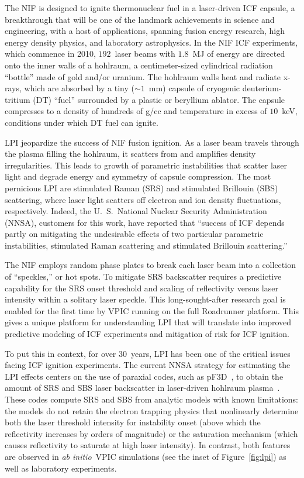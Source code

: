 \documentclass[journal,twoside]{IEEEtran}
\newcommand{\fig}[1]{Figure~\ref{fig:#1}}
\newcommand{\abinitio} {\textit{ab initio}}
\begin{document}
The NIF is designed to ignite thermonuclear fuel in a laser-driven ICF
capsule, a breakthrough that will be one of the landmark achievements
in science and engineering, with a host of applications, spanning
fusion energy research, high energy density physics, and laboratory
astrophysics.  In the NIF ICF experiments, which commence in 2010,
$192$~laser beams with $1.8$~MJ of energy are directed onto the inner
walls of a hohlraum, a centimeter-sized cylindrical radiation
``bottle'' made of gold and/or uranium.  The hohlraum walls heat and
radiate x-rays, which are absorbed by a tiny ($\sim 1$~mm) capsule of
cryogenic deuterium-tritium (DT) ``fuel'' surrounded by a plastic or
beryllium ablator.  The capsule compresses to a density of hundreds of
g/cc and temperature in excess of $10$~keV, conditions under which DT
fuel can ignite.

LPI jeopardize the success of NIF fusion ignition.  As a laser beam
travels through the plasma filling the hohlraum, it scatters from and
amplifies density irregularities.  This leads to growth of parametric
instabilities that scatter laser light and degrade energy and symmetry
of capsule compression.  The most pernicious LPI are stimulated Raman
(SRS) and stimulated Brillouin (SBS) scattering, where laser light
scatters off electron and ion density fluctuations, respectively.
Indeed, the U.~S.~National Nuclear Security Administration (NNSA),
customers for this work, have reported that ``success of ICF depends
partly on mitigating the undesirable effects of two particular
parametric instabilities, stimulated Raman scattering and stimulated
Brillouin scattering.''~\cite{LLNL_LPI_webpage}

The NIF employs random phase plates to break each laser beam into a
collection of ``speckles,'' or hot spots.  To mitigate SRS backscatter
requires a predictive capability for the SRS onset threshold and
scaling of reflectivity versus laser intensity within a solitary laser
speckle.  This long-sought-after research goal is enabled for the first time
by VPIC running on the full Roadrunner platform.  This gives a unique
platform for understanding LPI that will translate into improved
predictive modeling of ICF experiments and mitigation of risk for ICF
ignition.

To put this in context, for over $30$~years, LPI has been one of the
critical issues facing ICF ignition experiments.  The current NNSA
strategy for estimating the LPI effects centers on the use of paraxial
codes, such as pF3D~\cite{Berger_Phys_Plasmas_1998}, to obtain the
amount of SRS and SBS laser backscatter in laser-driven hohlraum
plasma~\cite{Glenzer_Nature_Physics_2007,Labaune_Nature_Physics_2007}.
These codes compute SRS and SBS from analytic models with known
limitations: the models do not retain the electron trapping physics
that nonlinearly determine both the laser threshold intensity for
instability onset (above which the reflectivity increases by orders of
magnitude) or the saturation mechanism (which causes reflectivity to
saturate at high laser intensity).  In contrast, both features are
observed in \abinitio\ VPIC simulations (see the inset of
\fig{lpi}) as well as laboratory
experiments.~\cite{Montgomery_et_al_Phys_Plasmas_2002}
\end{document}
